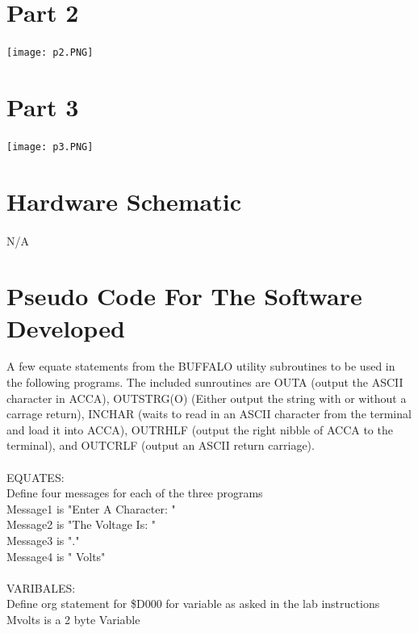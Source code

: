 \documentclass[12pt]{report}
\begin{document}
\section*{Part 2}

	\begin{center}
		\texttt{[image: p2.PNG]}
	\end{center}

\section*{Part 3}

	\begin{center}
		\texttt{[image: p3.PNG]}
	\end{center}

\section*{Hardware Schematic}
	\paragraph{}
		N/A

\section*{Pseudo Code For The Software Developed}
	A few equate statements from the BUFFALO utility subroutines to be used
	in the following programs.  The included sunroutines are OUTA (output the
	ASCII character in ACCA), OUTSTRG(O) (Either output the string with or without 
	a carrage return), INCHAR (waits to read in an ASCII character from the 
	terminal and load it into ACCA), OUTRHLF (output the right nibble of ACCA to 
	the terminal), and OUTCRLF (output an ASCII return carriage).\\\\

	EQUATES:\\
	Define four messages for each of the three programs\\
	Message1 is "Enter A Character: "\\
	Message2 is "The Voltage Is: "\\
	Message3 is "."\\
	Message4 is " Volts"\\\\

	VARIBALES:\\
	Define org statement for \$D000 for variable as asked in the lab instructions\\
	Mvolts is a 2 byte Variable\\\\
\end{document}
